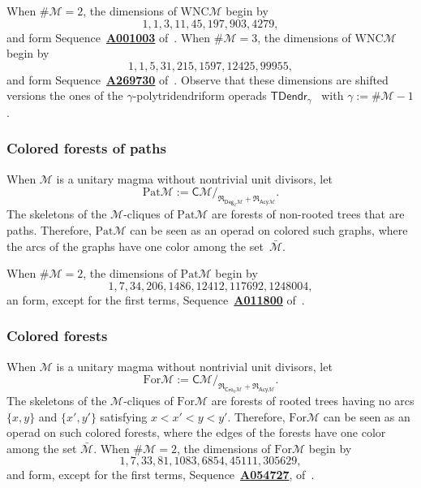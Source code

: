 \documentclass[10pt,reqno]{amsart}
\numberwithin{equation}{subsection}
\newcommand{\Mca}{\mathcal{M}}
\newcommand{\Cli}{\mathsf{C}}
\newcommand{\TDendr}{\mathsf{TDendr}}
\newcommand{\Deg}{\mathsf{Deg}}
\newcommand{\Cro}{\mathsf{Cro}}
\newcommand{\Acy}{\mathsf{Acy}}
\newcommand{\Paths}{\mathrm{Pat}}
\newcommand{\Forests}{\mathrm{For}}
\newcommand{\WNC}{\mathrm{WNC}}
\newcommand{\Rel}{\mathfrak{R}}
\newcommand{\OEIS}[1]{\href{http://oeis.org/#1}{{\bf #1}}}
\begin{document}
When $\# \Mca = 2$, the dimensions of $\WNC\Mca$ begin by
\begin{equation}
    1, 1, 3, 11, 45, 197, 903, 4279,
\end{equation}
and form Sequence~\OEIS{A001003} of~\cite{Slo}. When $\# \Mca = 3$, the
dimensions of $\WNC\Mca$ begin by
\begin{equation}
    1, 1, 5, 31, 215, 1597, 12425, 99955,
\end{equation}
and form Sequence~\OEIS{A269730} of~\cite{Slo}. Observe that these
dimensions are shifted versions the ones of the
$\gamma$-polytridendriform operads $\TDendr_\gamma$~\cite{Gir16} with
$\gamma := \# \Mca - 1$.
\medskip

\subsubsection{Colored forests of paths}
When $\Mca$ is a unitary magma without nontrivial unit divisors, let
\begin{equation}
    \Paths\Mca := \Cli\Mca/_{\Rel_{\Deg_2\Mca} + \Rel_{\Acy\Mca}}.
\end{equation}
The skeletons of the $\Mca$-cliques of $\Paths\Mca$ are forests of
non-rooted trees that are paths. Therefore, $\Paths\Mca$ can be seen as
an operad on colored such graphs, where the arcs of the graphs have one
color among the set~$\bar{\Mca}$.
\medskip

When $\# \Mca = 2$,
the dimensions of $\Paths\Mca$ begin by
\begin{equation}
    1, 7, 34, 206, 1486, 12412, 117692, 1248004,
\end{equation}
an form, except for the first terms, Sequence~\OEIS{A011800}
of~\cite{Slo}.
\medskip

\subsubsection{Colored forests}
When $\Mca$ is a unitary magma without nontrivial unit divisors, let
\begin{equation}
    \Forests\Mca := \Cli\Mca/_{\Rel_{\Cro_0\Mca} + \Rel_{\Acy\Mca}}.
\end{equation}
The skeletons of the $\Mca$-cliques of $\Forests\Mca$ are forests of
rooted trees having no arcs $\{x, y\}$ and $\{x', y'\}$ satisfying
$x < x' < y < y'$. Therefore, $\Forests\Mca$ can be seen as an operad
on such colored forests, where the edges of the forests have one color among
the set $\bar{\Mca}$. When $\# \Mca = 2$, the dimensions of
$\Forests\Mca$ begin by
\begin{equation}
    1, 7, 33, 81, 1083, 6854, 45111, 305629,
\end{equation}
and form, except for the first terms, Sequence~\OEIS{A054727},
of~\cite{Slo}.
\medskip
\end{document}
